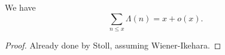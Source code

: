 \begin{theorem}[WeakPNT]
\label{WeakPNT}
\leanok
We have
  $$ \sum_{n \leq x} \Lambda(n) = x + o(x).$$
\end{theorem}
\begin{proof}
\leanok
Already done by Stoll, assuming Wiener-Ikehara.
\end{proof}
